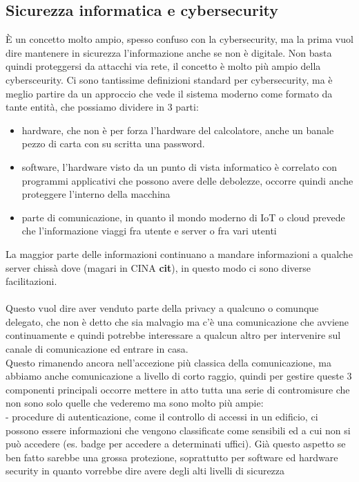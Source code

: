 \documentclass[oneside, 12pt]{extbook}
\begin{document}
\subsection{Sicurezza informatica e cybersecurity}
È un concetto molto ampio, spesso confuso con la cybersecurity, ma la prima vuol dire mantenere in sicurezza l'informazione anche se non è digitale. Non basta quindi proteggersi da attacchi via rete, il concetto è molto più ampio della cybersceurity. Ci sono tantissime definizioni standard per cybersecurity, ma è meglio partire da un approccio che vede il sistema moderno come formato da tante entità, che possiamo dividere in 3 parti:
\begin{itemize}
    \item hardware, che non è per forza l'hardware del calcolatore, anche un banale pezzo di carta con su scritta una password.
    \item software, l'hardware visto da un punto di vista informatico è correlato con programmi applicativi che possono avere delle debolezze, occorre quindi anche proteggere l'interno della macchina
    \item parte di comunicazione, in quanto il mondo moderno di IoT o cloud prevede che l'informazione viaggi fra utente e server o fra vari utenti
\end{itemize}
La maggior parte delle informazioni continuano a mandare informazioni a qualche server chissà dove (magari in CINA \textbf{cit}), in questo modo ci sono diverse facilitazioni.\\\\Questo vuol dire aver venduto parte della privacy a qualcuno o comunque delegato, che non è detto che sia malvagio ma c'è una comunicazione che avviene continuamente e quindi potrebbe interessare a qualcun altro per intervenire sul canale di comunicazione ed entrare in casa.\\Questo rimanendo ancora nell'accezione più classica della comunicazione, ma abbiamo anche comunicazione a livello di corto raggio, quindi per gestire queste 3 componenti principali occorre mettere in atto tutta una serie di contromisure che non sono solo quelle che vederemo ma sono molto più ampie:\\
- procedure di autenticazione, come il controllo di accessi in un edificio, ci possono essere informazioni che vengono classificate come sensibili ed a cui non si può accedere (es. badge per accedere a determinati uffici). Già questo aspetto se ben fatto sarebbe una grossa protezione, soprattutto per software ed hardware security in quanto vorrebbe dire avere degli alti livelli di sicurezza
\end{document}
